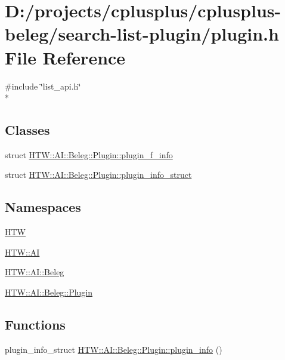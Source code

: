 \hypertarget{search-list-plugin_2plugin_8h}{\section{D\-:/projects/cplusplus/cplusplus-\/beleg/search-\/list-\/plugin/plugin.h File Reference}
\label{search-list-plugin_2plugin_8h}
}
{\ttfamily \#include \char`\"{}list\-\_\-api.\-h\char`\"{}}\\*
\subsection*{Classes}
\begin{DoxyCompactItemize}
\item 
struct \hyperlink{struct_h_t_w_1_1_a_i_1_1_beleg_1_1_plugin_1_1plugin__f__info}{H\-T\-W\-::\-A\-I\-::\-Beleg\-::\-Plugin\-::plugin\-\_\-f\-\_\-info}
\item 
struct \hyperlink{struct_h_t_w_1_1_a_i_1_1_beleg_1_1_plugin_1_1plugin__info__struct}{H\-T\-W\-::\-A\-I\-::\-Beleg\-::\-Plugin\-::plugin\-\_\-info\-\_\-struct}
\end{DoxyCompactItemize}
\subsection*{Namespaces}
\begin{DoxyCompactItemize}
\item 
\hyperlink{namespace_h_t_w}{H\-T\-W}
\item 
\hyperlink{namespace_h_t_w_1_1_a_i}{H\-T\-W\-::\-A\-I}
\item 
\hyperlink{namespace_h_t_w_1_1_a_i_1_1_beleg}{H\-T\-W\-::\-A\-I\-::\-Beleg}
\item 
\hyperlink{namespace_h_t_w_1_1_a_i_1_1_beleg_1_1_plugin}{H\-T\-W\-::\-A\-I\-::\-Beleg\-::\-Plugin}
\end{DoxyCompactItemize}
\subsection*{Functions}
\begin{DoxyCompactItemize}
\item 
plugin\-\_\-info\-\_\-struct \hyperlink{namespace_h_t_w_1_1_a_i_1_1_beleg_1_1_plugin_a09f048dbac5b6f35fca9900b50aa9224}{H\-T\-W\-::\-A\-I\-::\-Beleg\-::\-Plugin\-::plugin\-\_\-info} ()
\end{DoxyCompactItemize}
